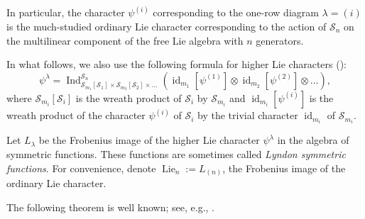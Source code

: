 \documentclass[12pt]%
{amsart}
\renewcommand\S{{\mathcal S}}
\DeclareMathOperator\Des{Des}
\newcommand{\Q}{{\mathcal Q}}
\newcommand{\la}{{\lambda}}
\newcommand{\Lie}{\operatorname{Lie}}
\newcommand{\Ind}{\operatorname{Ind}}
\theoremstyle{plain}
\theoremstyle{definition}
\theoremstyle{remark}
\newcommand{\id}{{\operatorname{id}}}
\newcommand{\todo}[1]{\vspace{5 mm}\par \noindent
	\marginpar{\textsc{ToDo}} \framebox{\begin{minipage}[c]{0.95
				\textwidth}
			#1 \end{minipage}}\vspace{5 mm}\par}
\begin{document}
In particular, the character $\psi^{(i)}$ corresponding to the one-row 
diagram 
$\la=(i)$ is the much-studied ordinary Lie character corresponding to the action of $\S_n$ on the multilinear component of the free Lie algebra with $n$ generators.

In what follows, we also use the following formula for higher Lie characters (\cite{Thrall}):%
\begin{equation}\label{eq:hlcformula}
\psi^{\la}=\Ind_{\S_{m_1}[\S_1]\times\S_{m_2}[\S_2]\times\ldots}^{\S_n}
\left(\id_{m_1}[\psi^{(1)}]\otimes\id_{m_2}[\psi^{(2)}]\otimes\ldots\right),
\end{equation}
where $\S_{m_i}[\S_i]$ is the wreath product of $\S_i$ by $\S_{m_i}$ and $\id_{m_i}[\psi^{(i)}]$ is the wreath product of the character $\psi^{(i)}$ of $\S_i$ by the trivial character $\id_{m_i}$ of $\S_{m_i}$.



Let $L_\la$ be the Frobenius image of the higher Lie character $\psi^\la$ in the algebra of symmetric functions. 
These functions are sometimes called {\em Lyndon symmetric functions}.  
For convenience, denote
$\Lie_n := L_{(n)}$, the Frobenius image of the ordinary Lie character.






The following theorem is well known; see, e.g., \cite[Theorem VII]{Thrall}.
\end{document}
